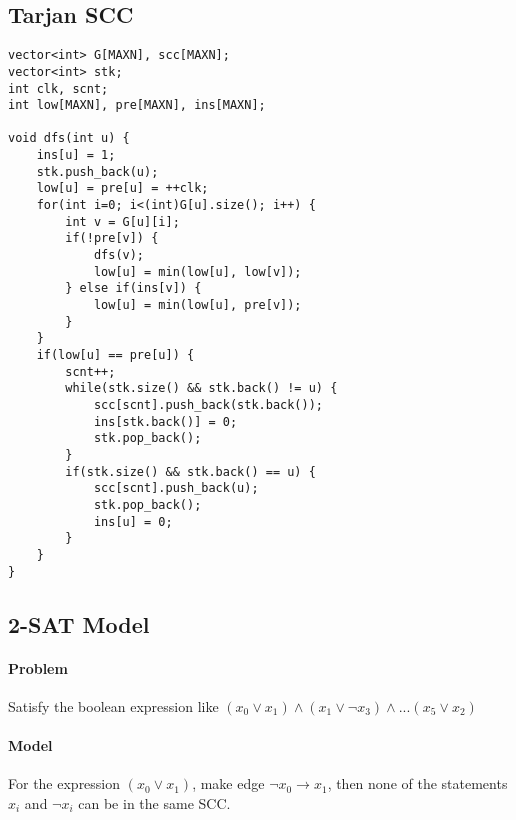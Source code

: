 \subsection{Tarjan SCC}
\begin{lstlisting}
vector<int> G[MAXN], scc[MAXN];
vector<int> stk;
int clk, scnt;
int low[MAXN], pre[MAXN], ins[MAXN];

void dfs(int u) {
	ins[u] = 1;
	stk.push_back(u);
	low[u] = pre[u] = ++clk;
	for(int i=0; i<(int)G[u].size(); i++) {
		int v = G[u][i];
		if(!pre[v]) {
			dfs(v);
			low[u] = min(low[u], low[v]);
		} else if(ins[v]) {
			low[u] = min(low[u], pre[v]);
		}
	}
	if(low[u] == pre[u]) {
		scnt++;
		while(stk.size() && stk.back() != u) {
			scc[scnt].push_back(stk.back());
			ins[stk.back()] = 0;
			stk.pop_back();
		}
		if(stk.size() && stk.back() == u) {
			scc[scnt].push_back(u);
			stk.pop_back();
			ins[u] = 0;
		}
	}
}
\end{lstlisting}
\subsection{2-SAT Model}
\paragraph{Problem}
Satisfy the boolean expression like $(x_0 \lor x_1) \land (x_1 \lor \neg x_3)\land ... (x_5 \lor x_2)$
\paragraph{Model}
For the expression $(x_0 \lor x_1)$, make edge $\neg x_0 \rightarrow x_1$, then none of the statements $x_i$ and $\neg x_i$ can be in the same SCC.
